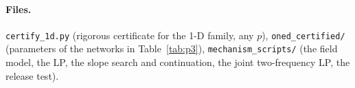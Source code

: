 \documentclass[11pt]{article}
\theoremstyle{definition}
\begin{document}
\paragraph{Files.}  \texttt{certify\_1d.py} (rigorous certificate for the 1-D family, any $p$), \texttt{oned\_certified/}
(parameters of the networks in Table~\ref{tab:p3}), \texttt{mechanism\_scripts/} (the field model, the LP, the slope search
and continuation, the joint two-frequency LP, the release test).
\end{document}
